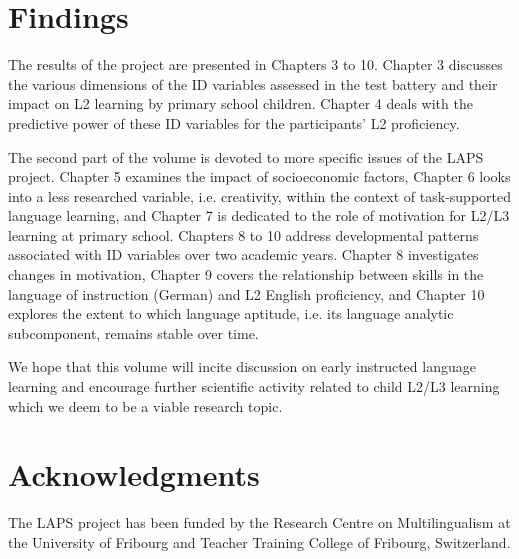\documentclass[output=paper]{langsci/langscibook}
\begin{document}
\section{Findings}\label{sec:intro:5}

The results of the project are presented in Chapters 3 to 10. Chapter 3 discusses the various dimensions of the ID variables assessed in the test battery and their impact on L2 learning by primary school children. Chapter 4 deals with the predictive power of these ID variables for the participants’ L2 proficiency.

The second part of the volume is devoted to more specific issues of the LAPS project. Chapter 5 examines the impact of socioeconomic factors, Chapter 6 looks into a less researched variable, i.e. creativity, within the context of task-supported language learning, and Chapter 7 is dedicated to the role of motivation for L2/L3 learning at primary school. Chapters 8 to 10 address developmental patterns associated with ID variables over two academic years. Chapter 8 investigates changes in motivation, Chapter 9 covers the relationship between skills in the language of instruction (German) and L2 English proficiency, and Chapter 10 explores the extent to which language aptitude, i.e. its language analytic subcomponent, remains stable over time.

We hope that this volume will incite discussion on early instructed language learning and encourage further scientific activity related to child L2/L3 learning which we deem to be a viable research topic.

\section*{Acknowledgments}

The LAPS project has been funded by the Research Centre on Multilingualism at the University of Fribourg and Teacher Training College of Fribourg, Switzerland. 
\end{document}
